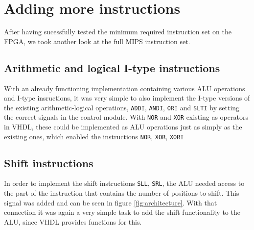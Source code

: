 \section{Adding more instructions}
After having sucessfully tested the minimum required instruction set on the FPGA,
we took another look at the full MIPS instruction set.

\subsection{Arithmetic and logical I-type instructions}
With an already functioning implementation containing various ALU operations and I-type insructions,
it was very simple to also implement the I-type versions of the existing arithmetic-logical operations, \texttt{ADDI}, \texttt{ANDI}, \texttt{ORI} and \texttt{SLTI} by setting the correct signals in the control module.
With \texttt{NOR} and \texttt{XOR} existing as operators in VHDL, these could be implemented as ALU operations just as simply as the existing ones,
which enabled the instructions \texttt{NOR}, \texttt{XOR}, \texttt{XORI}

\subsection{Shift instructions}
In order to implement the shift instructions \texttt{SLL}, \texttt{SRL},
the ALU needed access to the part of the instruction that contains the number of positions to shift.
This signal was added and can be seen in figure \ref{fig:architecture}.
With that connection it was again a very simple task to add the shift functionality to the ALU, since VHDL provides functions for this.
